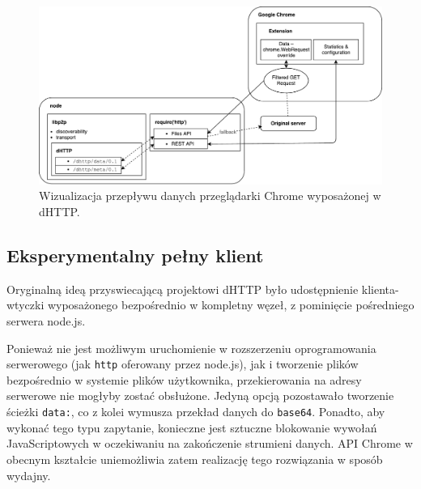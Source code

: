 \begin{figure}[h]
    \centering
    \includegraphics[scale=0.55]{client-flow.pdf}

    \caption{Wizualizacja przepływu danych przeglądarki Chrome wyposażonej w dHTTP.}
    \label{fig:client-flow}
\end{figure}

\newpage

\subsection{Eksperymentalny pełny klient}

Oryginalną ideą przyswiecającą projektowi dHTTP było udostępnienie klienta-wtyczki wyposażonego bezpośrednio w kompletny węzeł, z pominięcie pośredniego serwera node.js.

Ponieważ nie jest możliwym uruchomienie w rozszerzeniu oprogramowania serwerowego (jak \texttt{http} oferowany przez node.js), jak i tworzenie plików bezpośrednio w systemie plików użytkownika, przekierowania na adresy serwerowe nie mogłyby zostać obsłużone. Jedyną opcją pozostawało tworzenie ścieżki \texttt{data:}, co z kolei wymusza przekład danych do \texttt{base64}. Ponadto, aby wykonać tego typu zapytanie, konieczne jest sztuczne blokowanie wywołań JavaScriptowych w oczekiwaniu na zakończenie strumieni danych. API Chrome w obecnym kształcie uniemożliwia zatem realizację tego rozwiązania w sposób wydajny.
